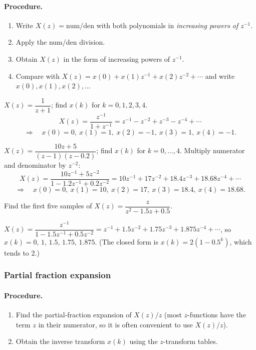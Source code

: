 \paragraph{Procedure.}
\begin{enumerate}
  \item Write $X(z)=\mathrm{num}/\mathrm{den}$ with both polynomials in \emph{increasing powers of $z^{-1}$}.
  \item Apply the num/den division.
  \item Obtain $X(z)$ in the form of increasing powers of $z^{-1}$.
  \item Compare with $X(z)=x(0)+x(1)z^{-1}+x(2)z^{-2}+\cdots$ and write $x(0),x(1),x(2),\dots$
\end{enumerate}

\begin{example}
$X(z)=\dfrac{1}{z+1}$; find $x(k)$ for $k=0,1,2,3,4$.
\[
  X(z)=\frac{z^{-1}}{1+z^{-1}}=z^{-1}-z^{-2}+z^{-3}-z^{-4}+\cdots
\]
\[
  \Rightarrow\quad x(0)=0,\ x(1)=1,\ x(2)=-1,\ x(3)=1,\ x(4)=-1.
\]
\end{example}

\begin{example}
$X(z)=\dfrac{10z+5}{(z-1)(z-0.2)}$; find $x(k)$ for $k=0,\dots,4$. Multiply numerator and denominator by $z^{-2}$:
\[
  X(z)=\frac{10z^{-1}+5z^{-2}}{1-1.2z^{-1}+0.2z^{-2}}=10z^{-1}+17z^{-2}+18.4z^{-3}+18.68z^{-4}+\cdots
\]
\[
  \Rightarrow\quad x(0)=0,\ x(1)=10,\ x(2)=17,\ x(3)=18.4,\ x(4)=18.68.
\]
\end{example}

\begin{problem}
Find the first five samples of $X(z)=\dfrac{z}{z^{2}-1.5z+0.5}$.
\end{problem}
\begin{solution}
$X(z)=\dfrac{z^{-1}}{1-1.5z^{-1}+0.5z^{-2}}=z^{-1}+1.5z^{-2}+1.75z^{-3}+1.875z^{-4}+\cdots$, so
$x(k)=0,\,1,\,1.5,\,1.75,\,1.875$. (The closed form is $x(k)=2(1-0.5^{k})$, which tends to $2$.)
\end{solution}

\subsubsection{Partial fraction expansion}
\paragraph{Procedure.}
\begin{enumerate}
  \item Find the partial-fraction expansion of $X(z)/z$ (most $z$-functions have the term $z$ in their
        numerator, so it is often convenient to use $X(z)/z$).
  \item Obtain the inverse transform $x(k)$ using the $z$-transform tables.
\end{enumerate}

